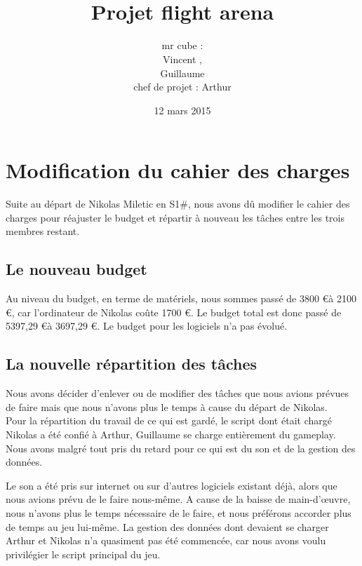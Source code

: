 \documentclass[10pt, titlepage]{report}
\title{\bsc{Rapport de la première soutenance}\\Projet flight arena}
\author{mr cube :\\
Vincent \bsc{Rospini-Clerici},\\
Guillaume \bsc{Rebut}\\
chef de projet : Arthur \bsc{Remaud}}
\date{12 mars 2015}
\begin{document}
\maketitle
\renewcommand{\contentsname}{Sommaire}
\renewcommand{\chaptername}{Partie}

\tableofcontents

\chapter{Modification du cahier des charges}
Suite au départ de Nikolas Miletic en S1\#, nous avons dû modifier le cahier des charges pour réajuster le budget et répartir à nouveau les tâches entre les trois membres restant.\\

\section{Le nouveau budget}

Au niveau du budget, en terme de matériels, nous sommes passé de 3800 \euro à 2100 \euro, car l'ordinateur de Nikolas coûte 1700 \euro. Le budget total est donc passé de 5397,29 \euro à 3697,29 \euro. Le budget pour les logiciels n'a pas évolué.

\section{La nouvelle répartition des tâches}

Nous avons décider d'enlever ou de modifier des tâches que nous avions prévues de faire mais que nous n'avons plus le temps à cause du départ de Nikolas.\\

Pour la répartition du travail de ce qui est gardé, le script dont était chargé Nikolas a été confié à Arthur, Guillaume se charge entièrement du gameplay. Nous avons malgré tout pris du retard pour ce qui est du son et de la gestion des données.

Le son a été pris sur internet ou sur d'autres logiciels existant déjà, alors que nous avions prévu de le faire nous-même. A cause de la baisse de main-d'œuvre, nous n'avons plus le temps nécessaire de le faire, et nous préférons accorder plus de temps au jeu lui-même. La gestion des données dont devaient se charger Arthur et Nikolas n'a quasiment pas été commencée, car nous avons voulu privilégier le script principal du jeu.\\
\end{document}
